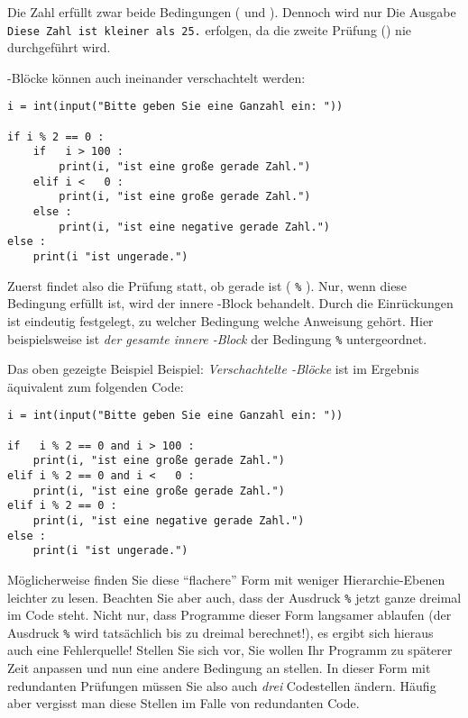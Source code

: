 Die Zahl  erfüllt zwar beide Bedingungen ( und ). Dennoch wird nur Die Ausgabe \texttt{Diese Zahl ist kleiner als 25.} erfolgen, da die zweite Prüfung () nie durchgeführt wird.

-Blöcke können auch ineinander verschachtelt werden:
\begin{codebox}
\begin{verbatim}
i = int(input("Bitte geben Sie eine Ganzahl ein: "))

if i % 2 == 0 :
    if   i > 100 :
        print(i, "ist eine große gerade Zahl.")
    elif i <   0 :
        print(i, "ist eine große gerade Zahl.")
    else :
        print(i, "ist eine negative gerade Zahl.")
else :
    print(i "ist ungerade.")
\end{verbatim}
\end{codebox}

Zuerst findet also die Prüfung statt, ob  gerade ist 
( \texttt{\%} ).		%
Nur, wenn diese Bedingung erfüllt ist, wird der innere -Block behandelt. Durch die Einrückungen ist eindeutig festgelegt, zu welcher Bedingung welche Anweisung gehört. Hier beispielsweise ist \emph{der gesamte innere -Block} der Bedingung 
 \texttt{\%} 		%
untergeordnet.

Das oben gezeigte Beispiel Beispiel: \emph{Verschachtelte -Blöcke} ist im Ergebnis äquivalent zum folgenden Code:
\begin{warnbox}[Beispiel: Redundanz bei \texttt{if} mit logischen Operatoren, leftupper=7mm]
\begin{verbatim}
i = int(input("Bitte geben Sie eine Ganzahl ein: "))

if   i % 2 == 0 and i > 100 :
    print(i, "ist eine große gerade Zahl.")
elif i % 2 == 0 and i <   0 :
    print(i, "ist eine große gerade Zahl.")
elif i % 2 == 0 :
    print(i, "ist eine negative gerade Zahl.")
else :
    print(i "ist ungerade.")
\end{verbatim}
\end{warnbox}

Möglicherweise finden Sie diese \enquote{flachere} Form mit weniger Hierarchie-Ebenen leichter zu lesen. Beachten Sie aber auch, dass der Ausdruck
 \texttt{\%} 		%
jetzt ganze dreimal im Code steht. Nicht nur, dass Programme dieser Form langsamer ablaufen (der Ausdruck
 \texttt{\%} 		%
wird tatsächlich bis zu dreimal berechnet!), es ergibt sich hieraus auch eine Fehlerquelle! Stellen Sie sich vor, Sie wollen Ihr Programm zu späterer Zeit anpassen und nun eine andere Bedingung an  stellen. In dieser Form mit redundanten Prüfungen müssen Sie also auch \emph{drei} Codestellen ändern. Häufig aber vergisst man diese Stellen im Falle von redundanten Code.

